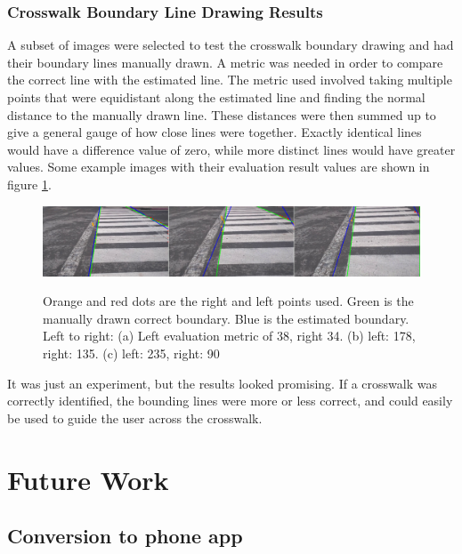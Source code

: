 \documentclass[12pt]{ucthesis}
\newcommand{\captionfonts}{\small\bf\ssp}
\begin{document}
\subsection{Crosswalk Boundary Line Drawing Results}

A subset of images were selected to test the crosswalk boundary drawing and had their boundary lines manually drawn. A metric was needed in order to compare the correct line with the estimated line. The metric used involved taking multiple points that were equidistant along the estimated line and finding the normal distance to the manually drawn line. These distances were then summed up to give a general gauge of how close lines were together. Exactly identical lines would have a difference value of zero, while more distinct lines would have greater values. Some example images with their evaluation result values are shown in figure \ref{fig:LinesUsingJustGoodStartAndEnds2}.

\begin{figure}[h!]
\begin{center}
\includegraphics[width=15cm]{LinesUsingJustGoodStartAndEnds2.png}
\captionfonts
\caption[Boundary Line Estimation Results]{Orange and red dots are the right and left points used. Green is the manually drawn correct boundary. Blue is the estimated boundary. Left to right: (a) Left evaluation metric of 38, right 34. (b) left: 178, right: 135. (c) left: 235, right: 90}
\label{fig:LinesUsingJustGoodStartAndEnds2}
\end{center}
\end{figure}

It was just an experiment, but the results looked promising. If a crosswalk was correctly identified, the bounding lines were more or less correct, and could easily be used to guide the user across the crosswalk. 


\chapter{Future Work}
\label{future work}

\section{Conversion to phone app}
\end{document}

